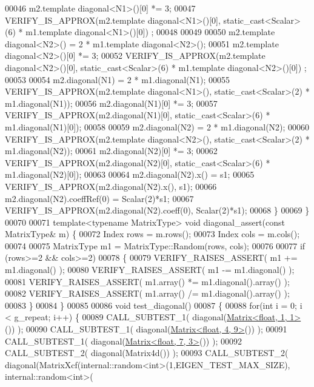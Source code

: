 \begin{DoxyCode}
00046     m2.template diagonal<N1>()[0] *= 3;
00047     VERIFY\_IS\_APPROX(m2.template diagonal<N1>()[0], static\_cast<Scalar>(6) * m1.template diagonal<N1>()[0])
      ;
00048 
00049 
00050     m2.template diagonal<N2>() = 2 * m1.template diagonal<N2>();
00051     m2.template diagonal<N2>()[0] *= 3;
00052     VERIFY\_IS\_APPROX(m2.template diagonal<N2>()[0], static\_cast<Scalar>(6) * m1.template diagonal<N2>()[0])
      ;
00053 
00054     m2.diagonal(N1) = 2 * m1.diagonal(N1);
00055     VERIFY\_IS\_APPROX(m2.template diagonal<N1>(), static\_cast<Scalar>(2) * m1.diagonal(N1));
00056     m2.diagonal(N1)[0] *= 3;
00057     VERIFY\_IS\_APPROX(m2.diagonal(N1)[0], \textcolor{keyword}{static\_cast<}Scalar\textcolor{keyword}{>}(6) * m1.diagonal(N1)[0]);
00058 
00059     m2.diagonal(N2) = 2 * m1.diagonal(N2);
00060     VERIFY\_IS\_APPROX(m2.template diagonal<N2>(), static\_cast<Scalar>(2) * m1.diagonal(N2));
00061     m2.diagonal(N2)[0] *= 3;
00062     VERIFY\_IS\_APPROX(m2.diagonal(N2)[0], \textcolor{keyword}{static\_cast<}Scalar\textcolor{keyword}{>}(6) * m1.diagonal(N2)[0]);
00063 
00064     m2.diagonal(N2).x() = s1;
00065     VERIFY\_IS\_APPROX(m2.diagonal(N2).x(), s1);
00066     m2.diagonal(N2).coeffRef(0) = Scalar(2)*s1;
00067     VERIFY\_IS\_APPROX(m2.diagonal(N2).coeff(0), Scalar(2)*s1);
00068   \}
00069 \}
00070 
00071 \textcolor{keyword}{template}<\textcolor{keyword}{typename} MatrixType> \textcolor{keywordtype}{void} diagonal\_assert(\textcolor{keyword}{const} MatrixType& m) \{
00072   Index rows = m.rows();
00073   Index cols = m.cols();
00074 
00075   MatrixType m1 = MatrixType::Random(rows, cols);
00076 
00077   \textcolor{keywordflow}{if} (rows>=2 && cols>=2)
00078   \{
00079     VERIFY\_RAISES\_ASSERT( m1 += m1.diagonal() );
00080     VERIFY\_RAISES\_ASSERT( m1 -= m1.diagonal() );
00081     VERIFY\_RAISES\_ASSERT( m1.array() *= m1.diagonal().array() );
00082     VERIFY\_RAISES\_ASSERT( m1.array() /= m1.diagonal().array() );
00083   \}
00084 \}
00085 
00086 \textcolor{keywordtype}{void} test\_diagonal()
00087 \{
00088   \textcolor{keywordflow}{for}(\textcolor{keywordtype}{int} i = 0; i < g\_repeat; i++) \{
00089     CALL\_SUBTEST\_1( diagonal(\hyperlink{group___core___module_class_eigen_1_1_matrix}{Matrix<float, 1, 1>}()) );
00090     CALL\_SUBTEST\_1( diagonal(\hyperlink{group___core___module_class_eigen_1_1_matrix}{Matrix<float, 4, 9>}()) );
00091     CALL\_SUBTEST\_1( diagonal(\hyperlink{group___core___module_class_eigen_1_1_matrix}{Matrix<float, 7, 3>}()) );
00092     CALL\_SUBTEST\_2( diagonal(Matrix4d()) );
00093     CALL\_SUBTEST\_2( diagonal(MatrixXcf(internal::random<int>(1,EIGEN\_TEST\_MAX\_SIZE), internal::random<int>(

\end{DoxyCode}

